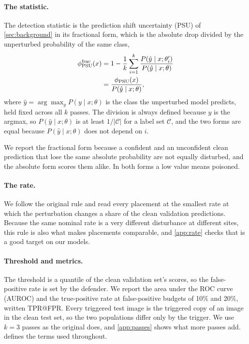 \paragraph{The statistic.}
The detection statistic is the prediction shift uncertainty (PSU) of
\cref{sec:background} in its fractional form, which is the absolute drop divided
by the unperturbed probability of the same class,
\begin{equation}
  \begin{split}
    \phi_{\mathrm{PSU}}^{\mathrm{frac}}(x)
      &= 1 - \frac{1}{k}\sum_{i=1}^{k}
        \frac{P(\hat y \mid x;\theta'_i)}{P(\hat y \mid x;\theta)} \\
      &= \frac{\phi_{\mathrm{PSU}}(x)}{P(\hat y \mid x;\theta)},
  \end{split}
  \label{eq:psu-fractional}
\end{equation}
where $\hat y = \arg\max_{y} P(y \mid x;\theta)$ is the class the unperturbed
model predicts, held fixed across all $k$ passes. The division is always
defined because $\hat y$ is the argmax, so $P(\hat y \mid x;\theta)$ is at
least $1/|\mathcal{C}|$ for a label set $\mathcal{C}$, and the two forms are
equal because $P(\hat y \mid x;\theta)$ does not depend on $i$.

We report the fractional form because a confident and an unconfident clean prediction that lose the same absolute probability are not equally disturbed, and the absolute form scores them alike. In both forms a low value means poisoned.

\paragraph{The rate.}
We follow the original rule and read every placement at the smallest rate at which the perturbation changes a share \AdaptiveShiftTarget{} of the clean validation predictions. Because the same nominal rate is a very different disturbance at different sites, this rule is also what makes placements comparable, and \cref{app:rate} checks that \AdaptiveShiftTarget{} is a good target on our models.

\paragraph{Threshold and metrics.}
The threshold is a quantile of the clean validation set's scores, so the false-positive rate is set by the defender. We report the area under the ROC curve (AUROC) and the true-positive rate at false-positive budgets of 10\% and 20\%, written TPR@FPR. Every triggered test image is the triggered copy of an image in the clean test set, so the two populations differ only by the trigger. We use $k = 3$ passes as the original does, and \cref{app:passes} shows what more passes add.  defines the terms used throughout.
